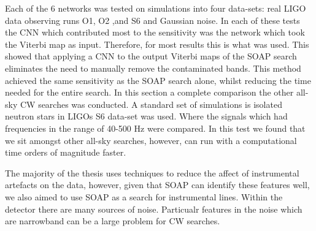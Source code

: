 Each of the 6 networks was tested on simulations into four data-sets: real \gls{LIGO} data observing runs O1, O2 ,and S6 and Gaussian noise.
In each of these tests the \gls{CNN} which contributed most to the sensitivity was the network which took the Viterbi map as input.
Therefore, for most results this is what was used. 
This showed that applying a \gls{CNN} to the output Viterbi maps of the SOAP search eliminates the need to manually remove the contaminated bands.
This method achieved the same sensitivity as the SOAP search alone, whilst reducing the time needed for the entire search.
In this section a complete comparison the other all-sky \gls{CW} searches was conducted.
A standard set of simulations is isolated neutron stars in \glspl{LIGO} S6 data-set was used.
Where the signals which had frequencies in the range of 40-500 Hz were compared. 
In this test we found that we sit amongst other all-sky searches, however, can run with a computational time orders of magnitude faster.

\bigskip

The majority of the thesis uses techniques to reduce the affect of instrumental artefacts on the data, however, given that SOAP can identify these features well, we also aimed to use SOAP as a search for instrumental lines.
Within the detector there are many sources of noise. 
Particualr features in the noise which are narrowband can be a large problem for \gls{CW} searches. 










